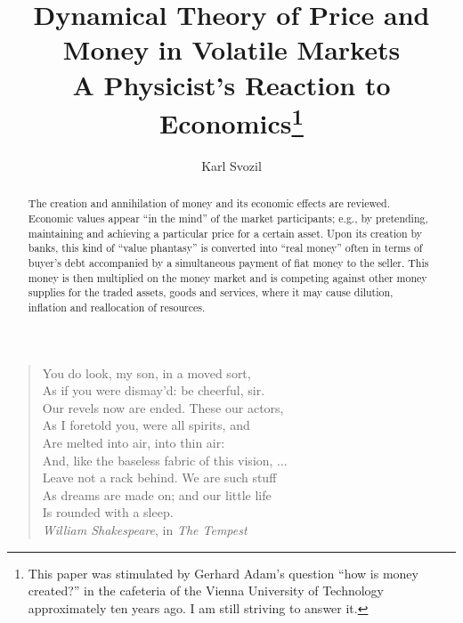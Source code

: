 \documentclass[aps,rmp,preprint,amsfonts,showpacs,showkeys]{revtex4}
\begin{document}



\title{Dynamical Theory of Price and Money in Volatile Markets \\ A Physicist's Reaction to Economics\footnote{This paper was stimulated by Gerhard Adam's question ``how is money created?'' in the cafeteria of the Vienna University of Technology approximately ten years ago. I am still striving to answer it.}
}


\author{Karl Svozil}

\begin{abstract}
The creation and annihilation of money and its economic effects are reviewed. Economic values appear ``in the mind'' of the market participants; e.g., by pretending, maintaining and achieving a particular price for a certain asset. Upon its creation by banks, this kind of ``value phantasy'' is converted into ``real money'' often in terms of buyer's debt accompanied by a simultaneous payment of fiat money to the seller. This money is then multiplied on the money market and is competing against other money supplies for the traded assets, goods and services, where it may cause dilution, inflation and reallocation of resources.
\end{abstract}


\maketitle


\tableofcontents

{\footnotesize
\begin{quote}
\begin{flushright}
You do look, my son, in a moved sort,              \\
As if you were dismay'd: be cheerful, sir.         \\
Our revels now are ended. These our actors,        \\
As I foretold you, were all spirits, and           \\
Are melted into air, into thin air:                \\
And, like the baseless fabric of this vision, $\ldots$     \\
Leave not a rack behind. We are such stuff         \\
As dreams are made on; and our little life         \\
Is rounded with a sleep.\\
{\em William Shakespeare}, in {\it The Tempest}
\end{flushright}
\end{quote}
}
\end{document}
